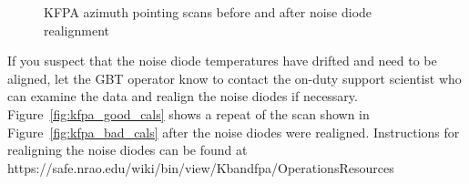 \vspace{-0.25cm}

\begin{figure}[!h]
\begin{center}
\hfill
{}
\caption{KFPA azimuth pointing scans before and after noise diode realignment}
\label{fig:kfpa_cals}
\end{center}
\end{figure}

\vspace{-0.25cm}

If you suspect that the noise diode temperatures have drifted and need to be
aligned, let the \gls{GBT} operator know to contact the on-duty support
scientist who can examine the data and realign the noise diodes if necessary.
Figure~\ref{fig:kfpa_good_cals} shows a repeat of the scan shown in
Figure~\ref{fig:kfpa_bad_cals} after the noise diodes were realigned. Instructions
for realigning the noise diodes can be found at\\
{https://safe.nrao.edu/wiki/bin/view/Kbandfpa/OperationsResources}
